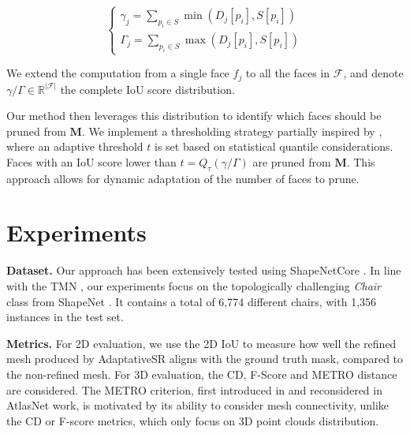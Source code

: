 \begin{equation}
\begin{cases}
     \gamma_{j}=\sum_{p_{i}\in S} \min \left(  D_{j}[p_{i}] , S[p_{i}] \right) \\
     \Gamma_{j}=\sum_{p_{i}\in S} \max \left( D_{j}[p_{i}],S[p_{i}] \right)
\end{cases}
\end{equation}

We extend the computation from a single face $f_{j}$ to all the faces in $\mathcal{F}$, and denote $\gamma/\Gamma \in \mathbb{R}^{|\mathcal{F}|}$ the complete \ac{IoU} score distribution.

Our method then leverages this distribution to identify which faces should be pruned from $\mathbf{M}$. We implement a thresholding strategy partially inspired by \citep{pan2019deep}, where an adaptive threshold $t$ is set based on statistical quantile considerations. Faces with an \ac{IoU} score lower than $t=Q_{\tau}(\gamma/\Gamma)$ are pruned from $\mathbf{M}$. This approach allows for dynamic adaptation of the number of faces to prune. 

\section{Experiments}
\label{sec:experiments}

\textbf{Dataset.} Our approach has been extensively tested using ShapeNetCore \citep{chang2015shapenet}. In line with the TMN \citep{pan2019deep}, our experiments focus on the topologically challenging \textit{Chair} class from ShapeNet \citep{chang2015shapenet}. It contains a total of 6,774 different chairs, with 1,356 instances in the test set.

\noindent\textbf{Metrics.} For 2D evaluation, we use the 2D \ac{IoU} to measure how well the refined mesh produced by AdaptativeSR aligns with the ground truth mask, compared to the non-refined mesh. For 3D evaluation, the \ac{CD}, F-Score and METRO distance are considered. The METRO criterion, first introduced in \citep{cignoni1998metro} and reconsidered in AtlasNet \citep{groueix2018papier} work, is motivated by its ability to consider mesh connectivity, unlike the \ac{CD} or F-score metrics, which only focus on 3D point clouds distribution. 

